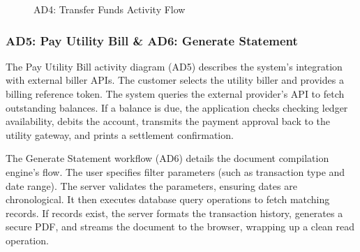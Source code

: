 \documentclass[11pt,a4paper]{article}
\begin{document}
\begin{figure}[H]
\begin{minipage}{0.48\textwidth}
  \caption{AD4: Transfer Funds Activity Flow}
\end{minipage}
\end{figure}

\newpage

\subsubsection{AD5: Pay Utility Bill \& AD6: Generate Statement}
The Pay Utility Bill activity diagram (AD5) describes the system's integration with external biller APIs. The customer selects the utility biller and provides a billing reference token. The system queries the external provider's API to fetch outstanding balances. If a balance is due, the application checks checking ledger availability, debits the account, transmits the payment approval back to the utility gateway, and prints a settlement confirmation.

The Generate Statement workflow (AD6) details the document compilation engine's flow. The user specifies filter parameters (such as transaction type and date range). The server validates the parameters, ensuring dates are chronological. It then executes database query operations to fetch matching records. If records exist, the server formats the transaction history, generates a secure PDF, and streams the document to the browser, wrapping up a clean read operation.
\end{document}
